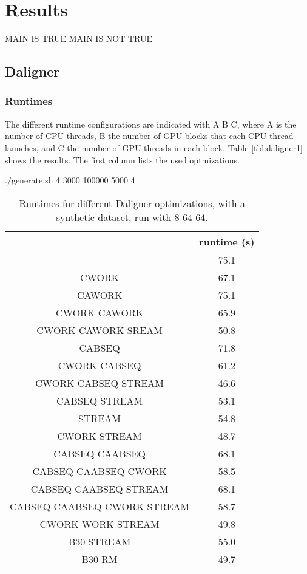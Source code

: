 \documentclass[../main/thesis.tex]{subfiles}
\begin{document}
\chapter{Results}
\ifdefined\main
\acresetall
MAIN IS TRUE
\newcommand{\codePath}{../5_results/code/}
\newcommand{\figPath}{../5_results/figures/}
\else
MAIN IS NOT TRUE

\fi


\section{Daligner}
\subsection{Runtimes}
The different runtime configurations are indicated with A B C, where A is the number of CPU threads, B the number of GPU blocks that each CPU thread launches, and C the number of GPU threads in each block.
Table \ref{tbl:daligner1} shows the results.
The first column lists the used optmizations.

./generate.sh 4 3000 100000 5000 4
\begin{table}
\centering
\caption{Runtimes for different Daligner optimizations, with a synthetic dataset, run with 8 64 64.}
\begin{tabular}{c c}
& runtime (s) \\ \hline
& 75.1 \\
CWORK & 67.1 \\
CAWORK & 75.1 \\
CWORK CAWORK & 65.9 \\
CWORK CAWORK SREAM & 50.8 \\
CABSEQ & 71.8 \\
CWORK CABSEQ & 61.2 \\
CWORK CABSEQ STREAM & 46.6 \\
CABSEQ STREAM & 53.1 \\
STREAM & 54.8 \\
CWORK STREAM & 48.7 \\
CABSEQ CAABSEQ & 68.1 \\
CABSEQ CAABSEQ CWORK & 58.5 \\
CABSEQ CAABSEQ STREAM & 68.1 \\
CABSEQ CAABSEQ CWORK STREAM & 58.7 \\
CWORK WORK STREAM & 49.8 \\ \hline
B30 STREAM & 55.0 \\
B30 RM & 49.7 \\
\end{tabular}
\end{table}
\end{document}
